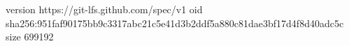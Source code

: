 version https://git-lfs.github.com/spec/v1
oid sha256:951faf90175bb9c3317abc21c5e41d3b2ddf5a880c81dae3bf17d4f8d40adc5c
size 699192
